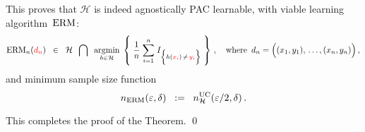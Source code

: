 This proves that $\mathcal{H}$ is indeed agnostically PAC learnable,
with viable learning algorithm \,$\textnormal{ERM}$:
\begin{equation*}
\textnormal{ERM}_{n}({\color{red}d_{n}})
\;\; \in \;\;
	\mathcal{H}
	\;\; \bigcap \;\;
	\underset{h\in\mathcal{H}}{\argmin}\;\left\{\;
		\dfrac{1}{n}\;\overset{n}{\underset{i=1}{\sum}}\;
		I_{\left\{h({\color{red}x_{i}})\,\overset{{\color{white}.}}{\neq}\,{\color{red}y_{i}}\right\}}
		\;\right\}\,,
	\quad
	\textnormal{where \,$d_{n} = \left((x_{1},y_{1}),\,\overset{{\color{white}\vert}}{\ldots}\,,(x_{n},y_{n})\right)$}\,,
\end{equation*}
and minimum sample size function
\begin{equation*}
n_{\textnormal{ERM}}(\varepsilon,\delta) \;\; := \;\; n^{\textnormal{UC}}_{\mathcal{H}}(\varepsilon/2,\delta)\,.
\end{equation*}

\vskip 0.3cm
\noindent
This completes the proof of the Theorem.
\qed


\renewcommand{\theenumi}{\roman{enumi}}
\renewcommand{\labelenumi}{\textnormal{(\theenumi)}$\;\;$}

